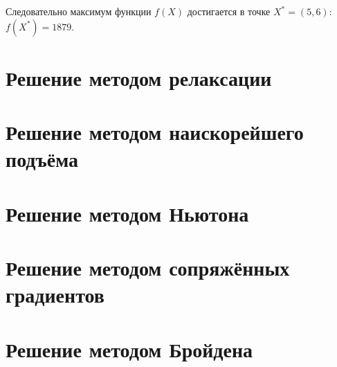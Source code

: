 Следовательно максимум функции $f(X)$ достигается в точке $X^* = (5, 6)$: $f(X^*) = 1879$.

\section{Решение методом релаксации}

\section{Решение методом наискорейшего подъёма}

\section{Решение методом Ньютона}

\section{Решение методом сопряжённых градиентов}

\section{Решение методом Бройдена}

